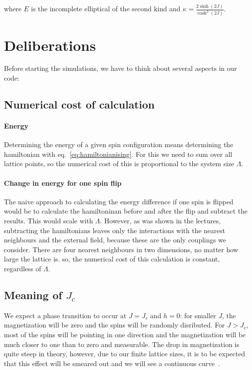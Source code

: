 \documentclass{scrartcl}
\begin{document}
where $E$ is the incomplete elliptical of the second kind and $\kappa=\frac{2\sinh(2J)}{\cosh^2(2J)}$.

\section{Deliberations}
Before starting the simulations, we have to think about several aspects in our code:
\subsection{Numerical cost of calculation}
\paragraph{Energy}
Determining the energy of a given spin configuration means determining the hamiltonian with eq.~\ref{eq:hamiltonianising}. For this we need to sum over all lattice points, so the numerical cost of this is proportional to the system size $\Lambda$.

\paragraph{Change in energy for one spin flip}
The naive approach to calculating the energy difference if one spin is flipped would be to calculate the hamiltoninan before and after the flip and subtract the results. This would scale with $\Lambda$. However, as was shown in the lectures, subtracting the hamiltonians leaves only the interactions with the nearest neighbours and the external field, because these are the only couplings we consider. There are four nearest neighbours in two dimensions, no matter how large the lattice is. so, the numerical cost of this calculation is constant, regardless of $\Lambda$.

\subsection{Meaning of $J_c$} 
We expect a phase transition to occur at $J=J_c$ and $h=0$: for smaller $J$, the magnetization will be zero and the spins will be randomly disributed. For $J>J_c$, most of the spins will be pointing in one direction and the magnetization will be much closer to one than to zero and measurable. The drop in magnetization is quite steep in theory, however, due to our finite lattice sizes, it is to be expected that this effect will be smeared out and we will see a continuous curve~\cite{YangMagnetization}\cite{binderheermann}.
\end{document}
